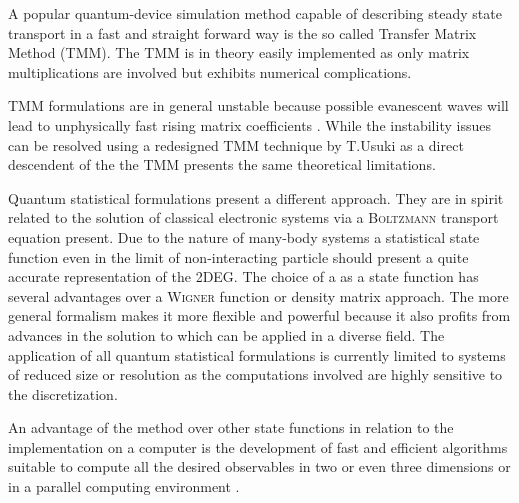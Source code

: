 A popular quantum-device simulation method capable of describing steady state transport in a fast and straight forward way is the so called Transfer Matrix Method (TMM)\cite{MacKinnon2003}. The TMM is in theory easily implemented as only matrix multiplications are involved but exhibits numerical complications.\par 
TMM formulations are in general unstable because possible evanescent waves will lead to unphysically fast rising matrix coefficients \cite{PhysRevB.38.9945}.
While the instability issues can be resolved using a redesigned TMM technique by T.Usuki \cite{PhysRevB.50.7615}\cite{PhysRevB.52.8244} as a direct descendent of the \sdg{} the TMM presents the same theoretical limitations.\par
Quantum statistical formulations present a different approach. They are in spirit related to the solution of classical electronic systems via a \textsc{Boltzmann} transport equation present. 
Due to the nature of many-body systems a statistical state function even in the limit of non-interacting particle should present a quite accurate representation of the 2DEG.  The choice of a \gfnc{} as a state function has several advantages over a \textsc{Wigner} function or density matrix approach.
The more general formalism makes it more flexible and powerful because it also profits from advances in the solution to \gfnc{} which can be applied in a diverse field.  The application of all quantum statistical formulations is currently limited to systems of reduced size or resolution as the computations involved are highly sensitive to the discretization.\par
An advantage of the \gfnc{} method over other state functions in relation to the implementation on a computer is the development of fast and efficient algorithms suitable to compute all the desired observables \cite{JApplPhys.91.2343} in two or even three dimensions or in a parallel computing environment \cite{Drouvelis2006parallel}.
